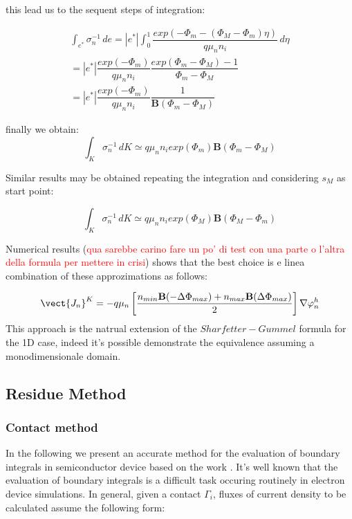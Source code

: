 this lead us to the sequent steps of integration:

\begin{multline*}
\int_{e^*} \sigma_n^{-1} \, de = |e^*| \int_0^1 \dfrac{exp \left(-\Phi_m - (\Phi_M-\Phi_m)\eta \right)}{q\mu_n n_i} 
 \, d\eta \\
 = |e^*|\dfrac{exp (-\Phi_m)}{q\mu_n n_i} \dfrac{exp ( \Phi_m-\Phi_M)-1}{\Phi_m-\Phi_M} \\
 =  |e^*|\dfrac{exp (-\Phi_m)}{q\mu_n n_i} \dfrac{1}{\mathbf{B}(\Phi_m-\Phi_M)}
\end{multline*}

finally we obtain:
\begin{equation}
\label{eq: finally approzimation 3D to 1D}
\int_{K} \sigma_n^{-1} \, dK \simeq  q \mu_n n_i exp(\Phi_m) \mathbf{B}(\Phi_m-\Phi_M)
\end{equation}

Similar results may be obtained repeating the integration and considering $s_M$ as start point:

\begin{equation}
\int_{K} \sigma_n^{-1} \, dK \simeq  q \mu_n n_i exp(\Phi_M) \mathbf{B}(\Phi_M-\Phi_m)
\end{equation}

Numerical results (\textcolor{red}{qua sarebbe carino fare un po' di test con una parte o l'altra della formula per mettere in crisi}) shows that the best choice is e linea combination of these approzimations as follows:

\begin{equation}
\label{eq: first formula for J}
\vect{J_n}^K = -  q \mu_n  \left[ \dfrac{ n_{min} \mathbf{B}(-\Delta \Phi_{max})  + n_{max}\mathbf{B}(\Delta \Phi_{max})}{2} \right]\nabla \varphi_n^h
\end{equation}
This approach is the natrual extension of the $Sharfetter-Gummel$ formula for the 1D case, indeed it's possible demonstrate the equivalence assuming a monodimensionale domain.




\subsection{Residue Method}
\subsubsection{Contact method}
In the following we present an accurate method for the evaluation of boundary integrals in semiconductor device based on the work .
It's well known that the evaluation of boundary integrals is a difficult task occuring routinely in electron device simulations. In general, given a contact $\Gamma_i$, fluxes of current density to be calculated assume the following form:

